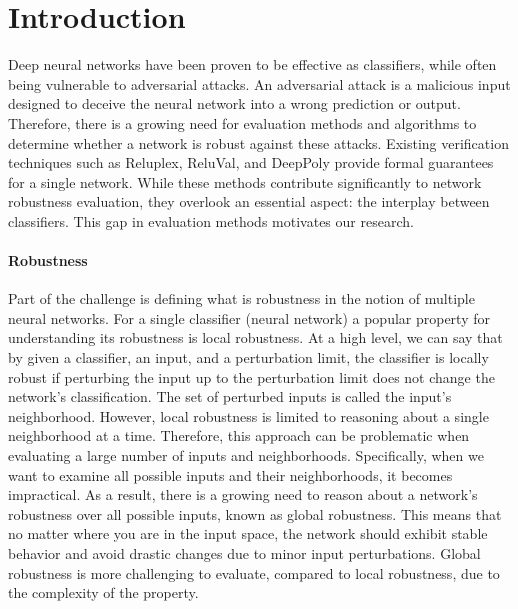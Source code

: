 
\section{Introduction}
Deep neural networks have been proven to be effective as classifiers, while often being vulnerable to adversarial attacks. An adversarial attack is a malicious input designed to deceive the neural network into a wrong prediction or output. Therefore, there is a growing need for evaluation methods and algorithms to determine whether a network is robust against these attacks. Existing verification techniques such as Reluplex, ReluVal, and DeepPoly provide formal guarantees for a single network. While these methods contribute significantly to network robustness evaluation, they overlook an essential aspect: the interplay between classifiers. This gap in evaluation methods motivates our research.


\paragraph{Robustness}
Part of the challenge is defining what is robustness in the notion of multiple neural networks. For a single classifier (neural network) a popular property for understanding its robustness is local robustness. At a high level, we can say that by given a classifier, an input, and a perturbation limit, the classifier is locally robust if perturbing the input up to the perturbation limit does not change the network’s classification. The set of perturbed inputs is called the input’s neighborhood. However, local robustness is limited to reasoning about a single neighborhood at a time. Therefore, this approach can be problematic when evaluating a large number of inputs and neighborhoods. Specifically, when we want to examine all possible inputs and their neighborhoods, it becomes impractical. As a result, there is a growing need to reason about a network’s robustness over all possible inputs, known as global robustness. This means that no matter where you are in the input space, the network should exhibit stable behavior and avoid drastic changes due to minor input perturbations. Global robustness is more challenging to evaluate, compared to local robustness, due to the complexity of the property. 


